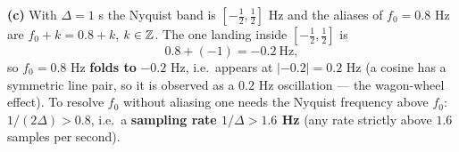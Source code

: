 \documentclass[11pt]{article}
\begin{document}
\textbf{(c)} With $\Delta=1$ s the Nyquist band is $[-\tfrac12,\tfrac12]$ Hz and the aliases of $f_0=0.8$ Hz are $f_0+k=0.8+k$, $k\in\mathbb{Z}$. The one landing inside $[-\tfrac12,\tfrac12]$ is
\[
0.8+(-1)=-0.2\ \text{Hz},
\]
so $f_0=0.8$ Hz \textbf{folds to} $-0.2$ Hz, i.e.\ appears at $|{-}0.2|=0.2$ Hz (a cosine has a symmetric line pair, so it is observed as a $0.2$ Hz oscillation --- the wagon-wheel effect). To resolve $f_0$ without aliasing one needs the Nyquist frequency above $f_0$: $1/(2\Delta)>0.8$, i.e.\ a \textbf{sampling rate $1/\Delta>1.6$ Hz} (any rate strictly above $1.6$ samples per second).
\end{document}
